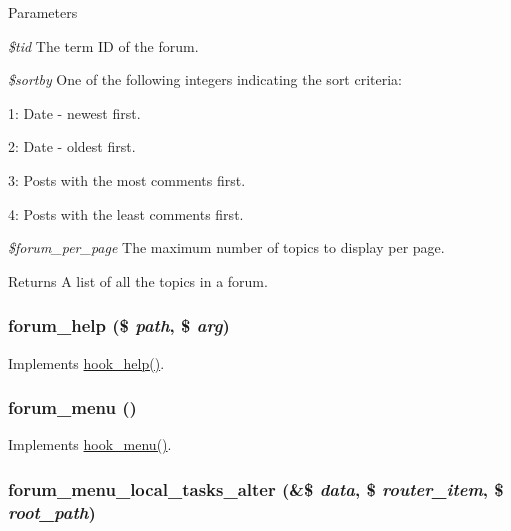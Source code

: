 \begin{DoxyParams}{Parameters}
\item[{\em \$tid}]The term ID of the forum. \item[{\em \$sortby}]One of the following integers indicating the sort criteria:
\begin{DoxyItemize}
\item 1: Date -\/ newest first.
\item 2: Date -\/ oldest first.
\item 3: Posts with the most comments first.
\item 4: Posts with the least comments first. 
\end{DoxyItemize}\item[{\em \$forum\_\-per\_\-page}]The maximum number of topics to display per page.\end{DoxyParams}
\begin{DoxyReturn}{Returns}
A list of all the topics in a forum. 
\end{DoxyReturn}
\hypertarget{forum_8module_a6b412760ac334421dcde78467c95c7d0}{
\subsubsection[{forum\_\-help}]{\setlength{\rightskip}{0pt plus 5cm}forum\_\-help (\$ {\em path}, \/  \$ {\em arg})}}
\label{forum_8module_a6b412760ac334421dcde78467c95c7d0}
Implements \hyperlink{group__hooks_ga5589c2714a782738e8851c4c90231f0e}{hook\_\-help()}. \hypertarget{forum_8module_a0421197a60856c7ee2cf2511f0d54ffc}{
\subsubsection[{forum\_\-menu}]{\setlength{\rightskip}{0pt plus 5cm}forum\_\-menu ()}}
\label{forum_8module_a0421197a60856c7ee2cf2511f0d54ffc}
Implements \hyperlink{group__hooks_ga5c95244fea59b25666e409759e133ded}{hook\_\-menu()}. \hypertarget{forum_8module_accd00b70ccd698d011c35ac51a5307be}{
\subsubsection[{forum\_\-menu\_\-local\_\-tasks\_\-alter}]{\setlength{\rightskip}{0pt plus 5cm}forum\_\-menu\_\-local\_\-tasks\_\-alter (\&\$ {\em data}, \/  \$ {\em router\_\-item}, \/  \$ {\em root\_\-path})}}
